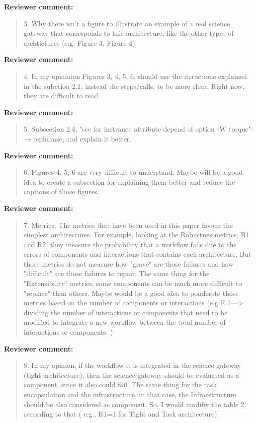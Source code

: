 \documentclass[a4]{letter}
\newenvironment{review}%
{\textbf{Reviewer comment:}\begin{quote}}%
{\end{quote}}%
\begin{document}
\begin{letter}{}
\begin{review}
  3. Why there isn't a figure to illustrate an example of a real
  science gateway that corresponds to this architecture, like the
  other types of archtictures (e.g. Figure 3, Figure 4)
\end{review}

\begin{review}
  4. In my opininion Figures 3, 4, 5, 6, should use the iteractions
  explained in the subction 2.1, instead the steps/calls, to be more
  clear. Right now, they are difficult to read.
\end{review}

\begin{review}
  5.  Subsection 2.4, "see for instrance attribute depend of option -W
  torque"-→ repharase, and explain it better.
\end{review}

\begin{review}
6.  Figures 4, 5, 6 are very difficult to understand. Maybe will be a
good idea to create a subsection for explaining them better and reduce
the captions of those figures.
\end{review}

\begin{review}
  7.  Metrics: The metrics that have been used in this paper favour
  the simplest architectures. For example, looking at the Robustnes
  metrics, R1 and R2, they measure the probability that a workflow
  fails due to the errors of components and interactions that contains
  each architecture. But those metrics do not measure how "grave" are
  those failures and how "difficult" are those failures to repair. The
  same thing for the "Extensibility" metrics, some components can be
  much more difficult to "replace" than others.  Maybe would be a good
  idea to ponderete those metrics based on the number of components or
  interactions (e.g E.1---> dividing the number of interactions or
  components that need to be modified to integrate a new workflow
  between the total number of interactions or components. )
\end{review}


\begin{review}
8. In my opinion, if the workflow it is integrated in the science
gateway (tight architecture), then the science gateway should be
evaluated as a component, since it also could fail. The same thing for
the task encapsulation and the infrastructure, in that case, the
Infraestructure should be also considered as component. So, I would
modifiy the table 2, according to that ( e.g., R1=1 for Tight and Task
architecture).
\end{review}


\end{letter}
\end{document}

